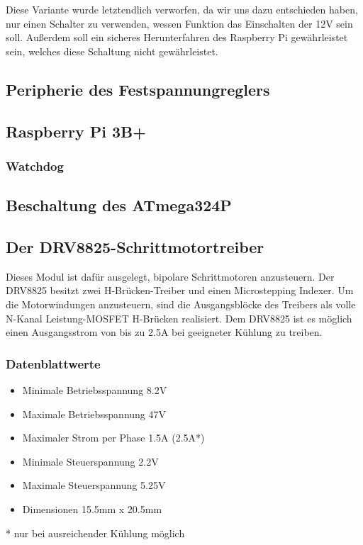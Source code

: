 Diese Variante wurde letztendlich verworfen, da wir uns dazu entschieden haben, nur einen Schalter zu verwenden, wessen Funktion das Einschalten der 12V sein soll.
Außerdem soll ein sicheres Herunterfahren des Raspberry Pi gewährleistet sein, welches diese Schaltung nicht gewährleistet.

\subsection{Peripherie des Festspannungreglers}

\subsection{Raspberry Pi 3B+}
\subsubsection{Watchdog}

\subsection{Beschaltung des ATmega324P}


\subsection{Der DRV8825-Schrittmotortreiber}

Dieses Modul ist dafür ausgelegt, bipolare Schrittmotoren anzusteuern.
Der DRV8825 besitzt zwei H-Brücken-Treiber und einen Microstepping Indexer.
Um die Motorwindungen anzusteuern, sind die Ausgangsblöcke des Treibers als volle N-Kanal Leistung-MOSFET H-Brücken realisiert.
Dem DRV8825 ist es möglich einen Ausgangsstrom von bis zu 2.5A bei geeigneter Kühlung zu treiben.

\subsubsection{Datenblattwerte}

\begin{itemize}
    \item Minimale Betriebsspannung 8.2V
    \item Maximale Betriebsspannung 47V
    \item Maximaler Strom per Phase 1.5A (2.5A*)
    \item Minimale Steuerspannung 2.2V
    \item Maximale Steuerspannung 5.25V
    \item Dimensionen 15.5mm x 20.5mm
\end{itemize}
* nur bei ausreichender Kühlung möglich

